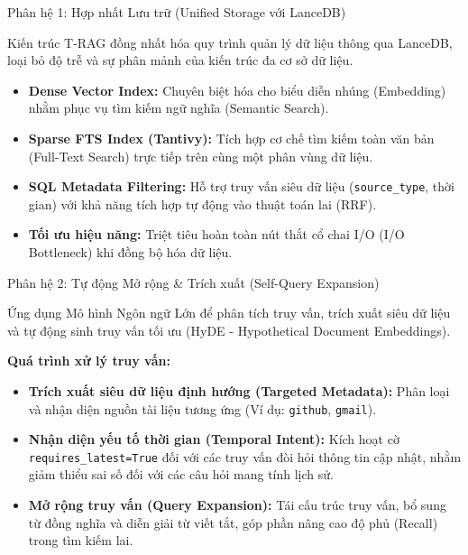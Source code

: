\documentclass[aspectratio=169, xcolor=table]{beamer}
\begin{document}
\begin{frame}{Phân hệ 1: Hợp nhất Lưu trữ (Unified Storage với LanceDB)}
    \begin{successbox}
        \small Kiến trúc T-RAG đồng nhất hóa quy trình quản lý dữ liệu thông qua LanceDB, loại bỏ độ trễ và sự phân mảnh của kiến trúc đa cơ sở dữ liệu.
    \end{successbox}
    
    \vspace{0.3cm}
    
    \begin{itemize}
        \small
        \item \textbf{Dense Vector Index:} Chuyên biệt hóa cho biểu diễn nhúng (Embedding) nhằm phục vụ tìm kiếm ngữ nghĩa (Semantic Search).
        \item \textbf{Sparse FTS Index (Tantivy):} Tích hợp cơ chế tìm kiếm toàn văn bản (Full-Text Search) trực tiếp trên cùng một phân vùng dữ liệu.
        \item \textbf{SQL Metadata Filtering:} Hỗ trợ truy vấn siêu dữ liệu (\texttt{source\_type}, thời gian) với khả năng tích hợp tự động vào thuật toán lai (RRF).
        \item \textbf{Tối ưu hiệu năng:} Triệt tiêu hoàn toàn nút thắt cổ chai I/O (I/O Bottleneck) khi đồng bộ hóa dữ liệu.
    \end{itemize}
\end{frame}

\begin{frame}{Phân hệ 2: Tự động Mở rộng \& Trích xuất (Self-Query Expansion)}
    \begin{infobox}
        \footnotesize Ứng dụng Mô hình Ngôn ngữ Lớn để phân tích truy vấn, trích xuất siêu dữ liệu và tự động sinh truy vấn tối ưu (HyDE - Hypothetical Document Embeddings).
    \end{infobox}
    
    \vspace{0.2cm}
    
    \textbf{\small Quá trình xử lý truy vấn:}
    \vspace{0.1cm}
    \begin{itemize}
        \small
        \item[\faCode] \textbf{Trích xuất siêu dữ liệu định hướng (Targeted Metadata):} Phân loại và nhận diện nguồn tài liệu tương ứng (Ví dụ: \texttt{github}, \texttt{gmail}).
        \item[\faClock] \textbf{Nhận diện yếu tố thời gian (Temporal Intent):} Kích hoạt cờ \texttt{requires\_latest=True} đối với các truy vấn đòi hỏi thông tin cập nhật, nhằm giảm thiểu sai số đối với các câu hỏi mang tính lịch sử.
        \item[\faExpand] \textbf{Mở rộng truy vấn (Query Expansion):} Tái cấu trúc truy vấn, bổ sung từ đồng nghĩa và diễn giải từ viết tắt, góp phần nâng cao độ phủ (Recall) trong tìm kiếm lai.
    \end{itemize}
\end{frame}
\end{document}
